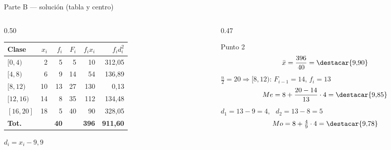 \documentclass[aspectratio=169,10pt]{beamer}
\begin{document}
\begin{frame}{Parte B — solución (tabla y centro)}
  \scriptsize
  \begin{columns}[T,onlytextwidth]
    \begin{column}{0.50\textwidth}
      \centering
      \begin{tabular}{@{}lrrrrr@{}}
        \toprule
        \textbf{Clase} & \textbf{$x_i$} & \textbf{$f_i$} & \textbf{$F_i$} &
        \textbf{$f_ix_i$} & \textbf{$f_id_i^2$} \\
        \midrule
        $[0,4)$   &  2 &  5 &  5 &  10 & 312{,}05 \\
        $[4,8)$   &  6 &  9 & 14 &  54 & 136{,}89 \\
        $[8,12)$  & 10 & 13 & 27 & 130 &   0{,}13 \\
        $[12,16)$ & 14 &  8 & 35 & 112 & 134{,}48 \\
        $[16,20]$ & 18 &  5 & 40 &  90 & 328{,}05 \\
        \midrule
        \textbf{Tot.} & & \textbf{40} & & \textbf{396} &
        \textbf{911{,}60} \\
        \bottomrule
      \end{tabular}
      {\tiny $d_i = x_i - 9{,}9$}
    \end{column}
    \begin{column}{0.47\textwidth}
      \begin{exampleblock}{Punto 2}
        \scriptsize
        \[ \bar{x} = \frac{396}{40} = \destacar{9{,}90} \]
        $\frac{n}{2}=20 \Rightarrow [8,12)$: $F_{i-1}=14$, $f_i=13$
        \[ Me = 8+\frac{20-14}{13}\cdot4 = \destacar{9{,}85} \]
        $d_1=13-9=4$, \ $d_2=13-8=5$
        \[ Mo = 8+\tfrac{4}{9}\cdot4 = \destacar{9{,}78} \]
      \end{exampleblock}
    \end{column}
  \end{columns}
\end{frame}
\end{document}
